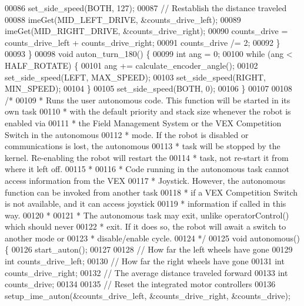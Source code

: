 \begin{DoxyCode}
00086     set_side_speed(BOTH, 127);
00087     \textcolor{comment}{// Restablish the distance traveled}
00088     imeGet(MID\_LEFT\_DRIVE, &counts\_drive\_left);
00089     imeGet(MID\_RIGHT\_DRIVE, &counts\_drive\_right);
00090     counts\_drive = counts\_drive\_left + counts\_drive\_right;
00091     counts\_drive /= 2;
00092   \}
00093 \}
00098 \textcolor{keywordtype}{void} auton_turn_180() \{
00099   \textcolor{keywordtype}{int} ang = 0;
00100   \textcolor{keywordflow}{while} (ang < HALF\_ROTATE) \{
00101     ang += calculate_encoder_angle();
00102     set_side_speed(LEFT, MAX\_SPEED);
00103     set_side_speed(RIGHT, MIN\_SPEED);
00104   \}
00105   set_side_speed(BOTH, 0);
00106 \}
00107 
00108 \textcolor{comment}{/*}
00109 \textcolor{comment}{ * Runs the user autonomous code. This function will be started in its own task}
00110 \textcolor{comment}{ * with the default priority and stack size whenever the robot is enabled via}
00111 \textcolor{comment}{ * the Field Management System or the VEX Competition Switch in the autonomous}
00112 \textcolor{comment}{ * mode. If the robot is disabled or communications is lost,  the autonomous}
00113 \textcolor{comment}{ * task will be stopped by the kernel. Re-enabling the robot will restart the}
00114 \textcolor{comment}{ * task, not re-start it from where it left off.}
00115 \textcolor{comment}{ *}
00116 \textcolor{comment}{ * Code running in the autonomous task cannot access information from the VEX}
00117 \textcolor{comment}{ * Joystick. However, the autonomous function can be invoked from another task}
00118 \textcolor{comment}{ * if a VEX Competition Switch is not available, and it can access joystick}
00119 \textcolor{comment}{ * information if called in this way.}
00120 \textcolor{comment}{ *}
00121 \textcolor{comment}{ * The autonomous task may exit, unlike operatorControl() which should never}
00122 \textcolor{comment}{ * exit. If it does so, the robot will await a switch to another mode or}
00123 \textcolor{comment}{ * disable/enable cycle.}
00124 \textcolor{comment}{ */}
00125 \textcolor{keywordtype}{void} autonomous() \{
00126   start_auton();
00127 
00128   \textcolor{comment}{// How far the left wheels have gone}
00129   \textcolor{keywordtype}{int} counts\_drive\_left;
00130   \textcolor{comment}{// How far the right wheels have gone}
00131   \textcolor{keywordtype}{int} counts\_drive\_right;
00132   \textcolor{comment}{// The average distance traveled forward}
00133   \textcolor{keywordtype}{int} counts\_drive;
00134 
00135   \textcolor{comment}{// Reset the integrated motor controllers}
00136   setup_ime_auton(&counts\_drive\_left, &counts\_drive\_right, &counts\_drive);

\end{DoxyCode}

